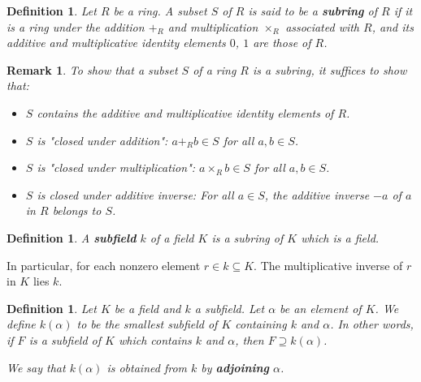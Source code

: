 \documentclass[a4paper,12pt]{report}
\newcounter{statement}
\numberwithin{statement}{chapter}
\newtheorem{defn}[statement]{Definition}
\newtheorem*{remark}{\bf Remark}
\numberwithin{equation}{chapter}
\numberwithin{section}{chapter}
\numberwithin{subsection}{section}
\begin{document}
\begin{defn}
Let $R$ be a ring.
A subset $S$ of $R$ is said to be a  {\bf subring}  of $R$ if it is a ring under the addition $+_R$ and multiplication $\times_R$ associated with $R$,
and its additive and multiplicative identity elements $0$, $1$ are those of $R$.
\end{defn}
\begin{remark}

To show that a subset $S$ of a ring $R$ is a subring,
it suffices to show that:
\begin{itemize}
\item 
$S$ contains the additive and multiplicative identity elements of $R$.

\item 
$S$ is "closed under addition": $a +_R b \in S$ for all $a,b \in S$.

\item 
$S$ is "closed under multiplication": $a \times_R b \in S$ for all $a, b\in S$.

\item 
$S$ is closed under additive inverse: For all $a \in S$, the additive inverse $-a$ of $a$
in $R$ belongs to $S$.
\end{itemize}
\end{remark}
\begin{defn}

A  {\bf subfield}  $k$ of a field $K$ is a subring of $K$ which is a field.
\end{defn}

In particular, for each nonzero element $r \in k \subseteq K$.  The multiplicative inverse of $r$ in $K$
lies $k$.

\begin{defn}

Let $K$ be a field and $k$ a subfield.  Let $\alpha$ be an element of $K$.
We define $k(\alpha)$ to be the smallest subfield of $K$ containing $k$ and $\alpha$.
In other words, if $F$ is a subfield of $K$ which contains $k$ and $\alpha$, then $F \supseteq k(\alpha)$.

We say that $k(\alpha)$ is obtained from $k$ by  {\bf adjoining}  $\alpha$.

\end{defn}
\end{document}
